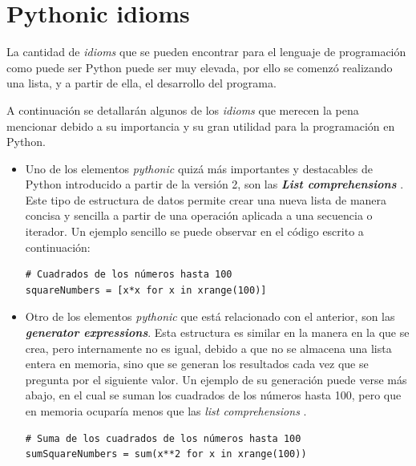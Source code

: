 \documentclass[a4paper, 12pt]{book}
\begin{document}
\chapter{Pythonic idioms}  
\label{app:idioms}

La cantidad de \textit{idioms} que se pueden encontrar para el lenguaje de programación como puede ser Python puede ser muy elevada, por ello se comenzó realizando una lista, y a partir de ella, el desarrollo del programa.

A continuación se detallarán algunos de los \textit{idioms} que merecen la pena mencionar debido a su importancia y su gran utilidad para la programación en Python.



\begin{itemize}


\item Uno de los elementos \textit{pythonic} quizá más importantes y destacables de Python introducido a partir de la versión 2, son las \textbf{\textit{List comprehensions}} \cite{lutz2014pythonlistcomp}. Este tipo de estructura de datos permite crear una nueva lista de manera concisa y sencilla a partir de una operación aplicada a una secuencia o iterador. Un ejemplo sencillo se puede observar en el código escrito a continuación:

\begin{verbatim}
# Cuadrados de los números hasta 100
squareNumbers = [x*x for x in xrange(100)]
\end{verbatim}



\item Otro de los elementos \textit{pythonic} que está relacionado con el anterior, son las \textbf{\textit{generator expressions}}. Esta estructura es similar en la manera en la que se crea, pero internamente no es igual, debido a que no se almacena una lista entera en memoria, sino que se generan los resultados cada vez que se pregunta por el siguiente valor. Un ejemplo de su generación puede verse más abajo, en el cual se suman los cuadrados de los números hasta 100, pero que en memoria ocuparía menos que las \textit{list comprehensions} \cite{ramalho2015fluent}.

\begin{verbatim}
# Suma de los cuadrados de los números hasta 100
sumSquareNumbers = sum(x**2 for x in xrange(100))
\end{verbatim}




\end{itemize}
\end{document}
